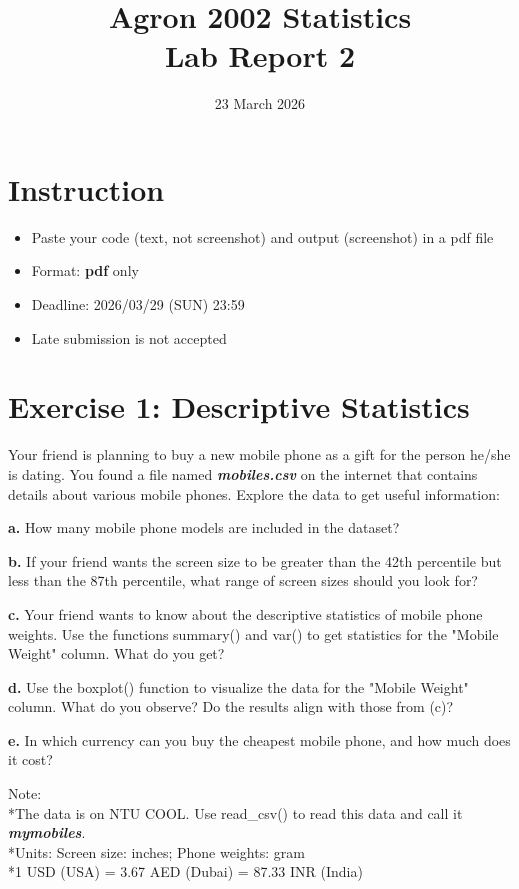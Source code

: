\documentclass[12pt,letterpaper]{article}
\title{Agron 2002 Statistics\\ {\bf Lab Report 2}}
\date{23 March 2026}
\begin{document}
\maketitle
\section*{Instruction}
\begin{itemize}
    \item Paste your code (text, not screenshot) and output (screenshot) in a pdf file
    \item Format: \textbf{pdf} only
    \item Deadline: 2026/03/29 (SUN) 23:59
    \item Late submission is not accepted
\end{itemize}


\section*{Exercise 1: Descriptive Statistics}
Your friend is planning to buy a new mobile phone as a gift for the person he/she is dating. 
You found a file named \textit{\textbf{mobiles.csv}} on the internet that contains details about various mobile 
phones. Explore the data to get useful information:

\textbf{a.} How many mobile phone models are included in the dataset?

\textbf{b.} If your friend wants the screen size to be greater than the 42th percentile but less than the 87th percentile, what range of screen sizes should you look for?

\textbf{c.} Your friend wants to know about the descriptive statistics of mobile phone weights. Use 
the functions summary() and var() to get statistics for the "Mobile Weight" column. 
What do you get?

\textbf{d.} Use the boxplot() function to visualize the data for the "Mobile Weight" column. What 
do you observe? Do the results align with those from (c)?

\textbf{e.} In which currency can you buy the cheapest mobile phone, and how much does it cost?

Note:\\
*The data is on NTU COOL. Use read\_csv() to read this data and call it \textit{\textbf{mymobiles}}. \\
*Units: Screen size: inches; Phone weights: gram \\
*1 USD (USA) = 3.67 AED (Dubai) = 87.33 INR (India)
\end{document}

